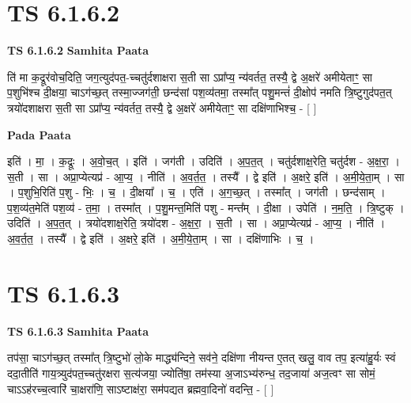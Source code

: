 \documentclass[17pt]{extarticle}
\begin{document}
\section*{ TS 6.1.6.2 }

\textbf{TS 6.1.6.2 } \newline
\textbf{Samhita Paata} \newline

ति॑ मा क॒द्रूर॑वोच॒दिति॒ जग॒त्युद॑पत॒-च्चतु॑र्दशाक्षरा स॒ती सा ऽप्रा᳚प्य॒ न्य॑वर्तत॒ तस्यै॒ द्वे अ॒क्षरे॑ अमीयेताꣳ॒॒ सा प॒शुभि॑श्च दी॒क्षया॒ चाऽग॑च्छ॒त् तस्मा॒ज्जग॑ती॒ छन्द॑सां पश॒व्य॑तमा॒ तस्मा᳚त् पशु॒मन्तं॑ दी॒क्षोप॑ नमति त्रि॒ष्टुगुद॑पत॒त् त्रयो॑दशाक्षरा स॒ती सा ऽप्रा᳚प्य॒ न्य॑वर्तत॒ तस्यै॒ द्वे अ॒क्षरे॑ अमीयेताꣳ॒॒ सा दक्षि॑णाभिश्च॒ - [  ] \newline

\textbf{Pada Paata} \newline

इति॑ । मा॒ । क॒द्रूः । अ॒वो॒च॒त् । इति॑ । जग॑ती । उदिति॑ । अ॒प॒त॒त् । चतु॑र्दशाक्ष॒रेति॒ चतु॑र्दश -   अ॒क्ष॒रा॒ । स॒ती । सा । अप्रा॒प्येत्यप्र॑ - आ॒प्य॒ । नीति॑ । अ॒व॒र्त॒त॒ । तस्यै᳚ । द्वे इति॑ । अ॒क्षरे॒ इति॑ । अ॒मी॒ये॒ता॒म् । सा । प॒शुभि॒रिति॑ प॒शु - भिः॒ । च॒ । दी॒क्षया᳚ । च॒ । एति॑ । अ॒ग॒च्छ॒त् । तस्मा᳚त् । जग॑ती । छन्द॑साम् । प॒श॒व्य॑त॒मेति॑ पश॒व्य॑ - त॒मा॒ । तस्मा᳚त् । प॒शु॒मन्त॒मिति॑ पशु - मन्त᳚म् । दी॒क्षा । उपेति॑ । न॒म॒ति॒ । त्रि॒ष्टुक् । उदिति॑ । अ॒प॒त॒त् । त्रयो॑दशाक्ष॒रेति॒ त्रयो॑दश - अ॒क्ष॒रा॒ । स॒ती । सा । अप्रा॒प्येत्यप्र॑ - आ॒प्य॒ । नीति॑ । अ॒व॒र्त॒त॒ । तस्यै᳚ । द्वे इति॑ । अ॒क्षरे॒ इति॑ । अ॒मी॒ये॒ता॒म् । सा । दक्षि॑णाभिः । च॒ ।  \newline




\section*{ TS 6.1.6.3 }

\textbf{TS 6.1.6.3 } \newline
\textbf{Samhita Paata} \newline

तप॑सा॒ चाऽग॑च्छ॒त् तस्मा᳚त् त्रि॒ष्टुभो॑ लो॒के माद्ध्य॑न्दिने॒ सव॑ने॒ दक्षि॑णा नीयन्त ए॒तत् खलु॒ वाव तप॒ इत्या॑हु॒र्यः स्वं ददा॒तीति॑ गाय॒त्र्युद॑पत॒च्चतु॑रक्षरा स॒त्य॑जया॒ ज्योति॑षा॒ तम॑स्या अ॒जाऽभ्य॑रुन्ध॒ तद॒जाया॑ अज॒त्वꣳ सा सोमं॒ चाऽऽह॑रच्च॒त्वारि॑ चा॒क्षरा॑णि॒ साऽष्टाक्ष॑रा॒ सम॑पद्यत ब्रह्मवा॒दिनो॑ वदन्ति॒ - [  ] \newline
\end{document}
